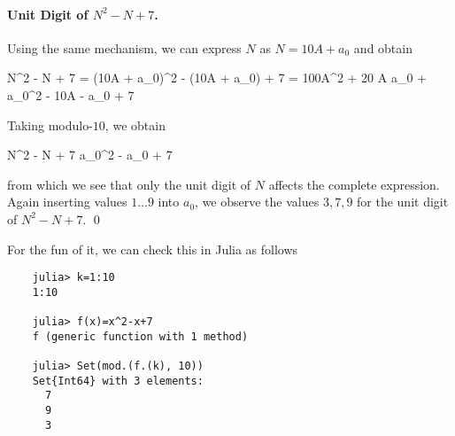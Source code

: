 \paragraph{Unit Digit of $N^2-N+7$.} Using the same mechanism, we can express $N$ as $N = 10A+  a_0$ and obtain

\bee
N^2 - N + 7 = (10A + a_0)^2 - (10A + a_0) + 7 = 100A^2 + 20 A a_0 + a_0^2 - 10A - a_0 + 7
\eee

Taking modulo-$10$, we obtain

\bee
N^2 - N + 7 \equiv a_0^2 - a_0 + 7 \mod
\eee

from which we see that only the unit digit of $N$ affects the complete expression. Again inserting values $1 \ldots 9$ into $a_0$, we observe the values $3, 7, 9$ for the unit digit of $N^2-N+7$. \qed

For the fun of it, we can check this in Julia as follows

\begin{verbatim}
    julia> k=1:10
    1:10

    julia> f(x)=x^2-x+7
    f (generic function with 1 method)

    julia> Set(mod.(f.(k), 10))
    Set{Int64} with 3 elements:
      7
      9
      3
\end{verbatim}


